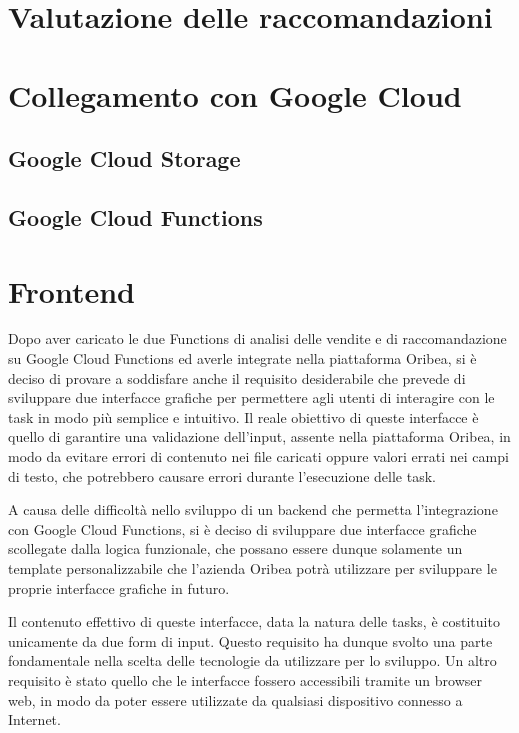 \section{Valutazione delle raccomandazioni}

\section{Collegamento con Google Cloud}
\subsection{Google Cloud Storage}
\subsection{Google Cloud Functions}

\section{Frontend}
\label{sec:frontend}

Dopo aver caricato le due Functions di analisi delle vendite e di raccomandazione su Google Cloud Functions ed averle integrate nella piattaforma Oribea, si è deciso di provare a soddisfare anche il requisito desiderabile che prevede di sviluppare due interfacce grafiche per permettere agli utenti di interagire con le task in modo più semplice e intuitivo. Il reale obiettivo di queste interfacce è quello di garantire una validazione dell'input, assente nella piattaforma Oribea, in modo da evitare errori di contenuto nei file caricati oppure valori errati nei campi di testo, che potrebbero causare errori durante l'esecuzione delle task.

A causa delle difficoltà nello sviluppo di un backend che permetta l'integrazione con Google Cloud Functions, si è deciso di sviluppare due interfacce grafiche scollegate dalla logica funzionale, che possano essere dunque solamente un template personalizzabile che l'azienda Oribea potrà utilizzare per sviluppare le proprie interfacce grafiche in futuro.

Il contenuto effettivo di queste interfacce, data la natura delle tasks, è costituito unicamente da due form di input. Questo requisito ha dunque svolto una parte fondamentale nella scelta delle tecnologie da utilizzare per lo sviluppo.
Un altro requisito è stato quello che le interfacce fossero accessibili tramite un browser web, in modo da poter essere utilizzate da qualsiasi dispositivo connesso a Internet.


